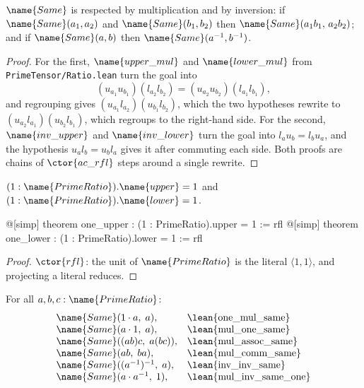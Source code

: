 \begin{lemma}\label{MulRat:lem:congr}
$\name{Same}$ is respected by multiplication and by inversion:
if $\name{Same}(a_1,a_2)$ and $\name{Same}(b_1,b_2)$ then
$\name{Same}(a_1 b_1,\, a_2 b_2)$; and if $\name{Same}(a,b)$ then
$\name{Same}(a^{-1}, b^{-1})$.
\end{lemma}

\begin{proof}
For the first, $\name{upper\_mul}$ and $\name{lower\_mul}$ from
\texttt{PrimeTensor/Ratio.lean} turn the goal into
\[
  (u_{a_1} u_{b_1})(l_{a_2} l_{b_2})
    = (u_{a_2} u_{b_2})(l_{a_1} l_{b_1}),
\]
and regrouping gives
$(u_{a_1} l_{a_2})(u_{b_1} l_{b_2})$, which the two hypotheses rewrite to
$(u_{a_2} l_{a_1})(u_{b_2} l_{b_1})$, which regroups to the right-hand side.
For the second, $\name{inv\_upper}$ and $\name{inv\_lower}$ turn the goal into
$l_a u_b = l_b u_a$, and the hypothesis $u_a l_b = u_b l_a$ gives it after
commuting each side.  Both proofs are chains of $\ctor{ac\_rfl}$ steps around
a single rewrite.
\end{proof}

\begin{lemma}\label{MulRat:lem:one-fields}
$(1 : \name{PrimeRatio}).\name{upper} = 1$ and
$(1 : \name{PrimeRatio}).\name{lower} = 1$.
\end{lemma}

\begin{leancode}
@[simp] theorem one_upper : (1 : PrimeRatio).upper = 1 := rfl
@[simp] theorem one_lower : (1 : PrimeRatio).lower = 1 := rfl
\end{leancode}

\begin{proof}
$\ctor{rfl}$: the unit of $\name{PrimeRatio}$ is the literal
$\langle 1, 1 \rangle$, and projecting a literal reduces.
\end{proof}

\begin{lemma}\label{MulRat:lem:laws-same}
For all $a, b, c : \name{PrimeRatio}$:
\[
  \begin{array}{ll}
    \name{Same}(1 \cdot a,\; a), &
      \text{\lean{one\_mul\_same}} \\
    \name{Same}(a \cdot 1,\; a), &
      \text{\lean{mul\_one\_same}} \\
    \name{Same}((a b) c,\; a (b c)), &
      \text{\lean{mul\_assoc\_same}} \\
    \name{Same}(a b,\; b a), &
      \text{\lean{mul\_comm\_same}} \\
    \name{Same}((a^{-1})^{-1},\; a), &
      \text{\lean{inv\_inv\_same}} \\
    \name{Same}(a \cdot a^{-1},\; 1), &
      \text{\lean{mul\_inv\_same\_one}}
  \end{array}
\]
\end{lemma}

